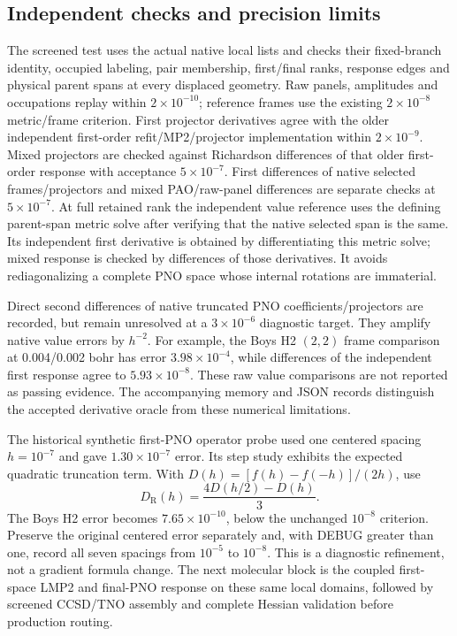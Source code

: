 \documentclass[11pt]{article}
\begin{document}
\subsection{Independent checks and precision limits}
The screened test uses the actual native local lists and checks their
fixed-branch identity, occupied labeling, pair membership, first/final ranks,
response edges and physical parent spans at every displaced geometry.
Raw panels, amplitudes and occupations replay within $2\times10^{-10}$;
reference frames use the existing $2\times10^{-8}$ metric/frame criterion.
First projector derivatives agree with the older independent first-order
refit/MP2/projector implementation within $2\times10^{-9}$.
Mixed projectors are checked against Richardson differences of that older
first-order response with acceptance $5\times10^{-7}$. First differences of
native selected frames/projectors and mixed PAO/raw-panel differences are
separate checks at $5\times10^{-7}$. At full retained rank the independent
value reference uses the defining parent-span metric solve after verifying
that the native selected span is the same. Its independent first derivative
is obtained by differentiating this metric solve; mixed response is checked
by differences of those derivatives. It avoids rediagonalizing a complete
PNO space whose internal rotations are immaterial.

Direct second differences of native truncated PNO coefficients/projectors
are recorded, but remain unresolved at a $3\times10^{-6}$ diagnostic target.
They amplify native value errors by $h^{-2}$. For example, the Boys H2
$(2,2)$ frame comparison at 0.004/0.002 bohr has error
$3.98\times10^{-4}$, while differences of the independent first response
agree to $5.93\times10^{-8}$. These raw value comparisons are not reported
as passing evidence. The accompanying memory and JSON records distinguish
the accepted derivative oracle from these numerical limitations.

The historical synthetic first-PNO operator probe used one centered spacing
$h=10^{-7}$ and gave $1.30\times10^{-7}$ error. Its step study exhibits the
expected quadratic truncation term. With $D(h)=[f(h)-f(-h)]/(2h)$, use
\begin{equation}
 D_{\mathrm R}(h)=\frac{4D(h/2)-D(h)}{3} .
\end{equation}
The Boys H2 error becomes $7.65\times10^{-10}$, below the unchanged
$10^{-8}$ criterion. Preserve the original centered error separately and,
with DEBUG greater than one, record all seven spacings from $10^{-5}$ to
$10^{-8}$. This is a diagnostic refinement, not a gradient formula change.
The next molecular block is the coupled first-space LMP2 and final-PNO
response on these same local domains, followed by screened CCSD/TNO
assembly and complete Hessian validation before production routing.
\end{document}
